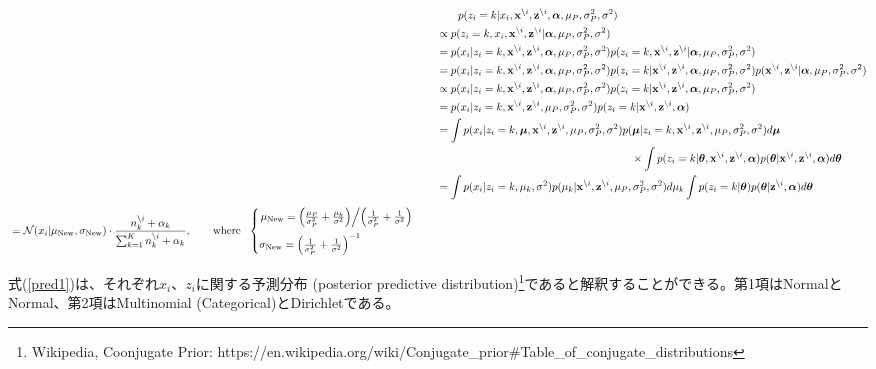 \documentclass[a4paper,10.5pt,uplatex]{jsarticle}  %
\newcommand{\E}{\mathbb{E}}
\newcommand{\cN}{\mathcal{N}}
\newcommand{\btheta}{\boldsymbol{\theta}}
\newcommand{\balpha}{\boldsymbol{\alpha}}
\newcommand{\bmu}{\boldsymbol{\mu}}
\newcommand{\bz}{\mathbf{z}}
\newcommand{\bx}{\mathbf{x}}
\newcommand{\deli}{{\backslash i}}
\begin{document}
\begin{align}
  &\qquad p(z_i = k| x_i, \bx^\deli, \bz^\deli, \balpha, \mu_P, \sigma^2_P, \sigma^2)\\
  &\propto p(z_i=k, x_i, \bx^\deli, \bz^\deli | \balpha, \mu_P, \sigma^2_P, \sigma^2)\\
  &= p(x_i | z_i=k, \bx^\deli, \bz^\deli, \balpha, \mu_P, \sigma^2_P, \sigma^2) p(z_i=k, \bx^\deli, \bz^\deli | \balpha, \mu_P, \sigma^2_P, \sigma^2)\\
  &= p(x_i | z_i=k, \bx^\deli, \bz^\deli, \balpha, \mu_P, \sigma^2_P, \sigma^2) p(z_i=k | \bx^\deli, \bz^\deli, \balpha, \mu_P, \sigma^2_P, \sigma^2) p(\bx^\deli, \bz^\deli | \balpha, \mu_P, \sigma^2_P, \sigma^2)\\
  &\propto p(x_i | z_i=k, \bx^\deli, \bz^\deli, \balpha, \mu_P, \sigma^2_P, \sigma^2) p(z_i=k| \bx^\deli, \bz^\deli, \balpha, \mu_P, \sigma^2_P, \sigma^2)\\
  &= p(x_i | z_i=k, \bx^\deli, \bz^\deli,  \mu_P, \sigma^2_P, \sigma^2) p(z_i=k| \bx^\deli, \bz^\deli, \balpha)\\
  &= \int p(x_i| z_i=k, \bmu, \bx^\deli, \bz^\deli,  \mu_P, \sigma_P^2, \sigma^2) p(\bmu |z_i=k, \bx^\deli, \bz^\deli,  \mu_P, \sigma^2_P, \sigma^2) d\bmu \\
  &\qquad \qquad \qquad \qquad \qquad \qquad \qquad \qquad \qquad \times \int p(z_i=k| \btheta, \bx^\deli, \bz^\deli, \balpha) p(\btheta | \bx^\deli, \bz^\deli, \balpha) d\btheta\\
  &= \int p(x_i | z_i=k, \mu_k, \sigma^2) p(\mu_k | \bx^\deli, \bz^\deli, \mu_P, \sigma^2_P, \sigma^2) d\mu_k \int p(z_i =k|\btheta) p(\btheta | \bz^\deli,\balpha) d\btheta \label{pred1}\\[3.5pt]
  \begin{split}
  &= \cN(x_i | \mu_{\rm New}, \sigma_{\rm New}) \cdot \frac{n_k^{\backslash i} + \alpha_k}{\sum_{k=1}^{K} n_k^{\backslash i} + \alpha_k},
\qquad {\rm where} \ \ 
    \begin{cases} 
      \left. \mu_{\rm New} = \left( \frac{\mu_P}{\sigma_P^2} + \frac{\mu_k}{\sigma^2} \right) \middle/ \left( \frac{1}{\sigma_P^2} + \frac{1}{\sigma^2} \right) \right.   \\[8pt] 
     \sigma_{\rm New} = \left( \frac{1}{\sigma_P^2} + \frac{1}{\sigma^2}  \right)^{-1}
    \end{cases} 
  \end{split}
\end{align}

式(\ref{pred1})は、それぞれ$x_i$、$z_i$に関する予測分布 (posterior predictive distribution)\footnote{Wikipedia, Coonjugate Prior: https://en.wikipedia.org/wiki/Conjugate\_prior\#Table\_of\_conjugate\_distributions}であると解釈することができる。第1項はNormalとNormal、第2項はMultinomial (Categorical)とDirichletである。
\end{document}
